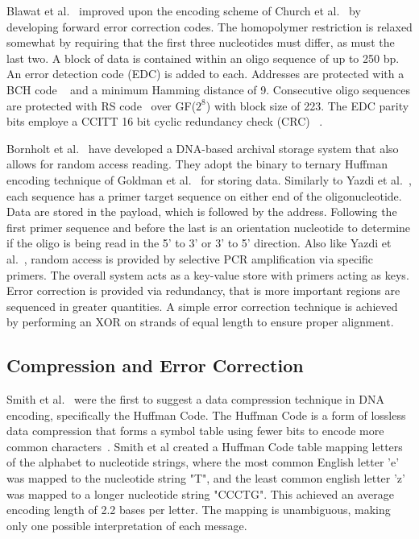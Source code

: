 \documentclass{bioinfo}
\begin{document}
Blawat et al.~\cite{BLAWAT2016} improved upon the encoding scheme of Church et al.~\cite{CHURCH2012} by developing forward error correction codes. The homopolymer restriction is relaxed somewhat by requiring that the first three nucleotides must differ, as must the last two. A block of data is contained within an oligo sequence of up to 250 bp. An error detection code (EDC) is added to each. Addresses are protected with a BCH code ~\cite{BOSE1960} and a minimum Hamming distance of 9. Consecutive oligo sequences are protected with RS code~\cite{REED1960} over GF($2^8$) with block size of 223. The EDC parity bits employe a CCITT 16 bit cyclic redundancy check (CRC) ~\cite{LIN2004}.

Bornholt et al.~\cite{BORNHOLT2016} have developed a DNA-based archival storage system that also allows for random access reading. They adopt the binary to ternary Huffman encoding technique of Goldman et al.~\cite{GOLDMAN2013} for storing data. Similarly to Yazdi et al.~\cite{YAZDI2015}, each sequence has a primer target sequence on either end of the oligonucleotide. Data are stored in the payload, which is followed by the address. Following the first primer sequence and before the last is an orientation nucleotide to determine if the oligo is being read in the 5' to 3' or 3' to 5' direction. Also like Yazdi et al.~\cite{YAZDI2015}, random access is provided by selective PCR amplification via specific primers. The overall system acts as a key-value store with primers acting as keys. Error correction is provided via redundancy, that is more important regions are sequenced in greater quantities. A simple error correction technique is achieved by performing an XOR on strands of equal length to ensure proper alignment.

\subsection{Compression and Error Correction}

Smith et al.~\cite{SFHC2003BL} were the first to suggest a data compression technique in DNA encoding, specifically the Huffman Code. The Huffman Code is a form of lossless data compression that forms a symbol table using fewer bits to encode more common characters~\cite{H1952POTIRE}. Smith et al created a Huffman Code table mapping letters of the alphabet to nucleotide strings, where the most common English letter 'e' was mapped to the nucleotide string "T", and the least common english letter 'z' was mapped to a longer nucleotide string "CCCTG". This achieved an average encoding length of 2.2 bases per letter. The mapping is unambiguous, making only one possible interpretation of each message.
\end{document}
